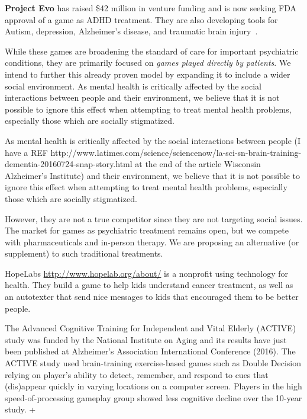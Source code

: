 \textbf{Project Evo} has raised \$42 million in venture funding and is now seeking FDA approval of a game as ADHD treatment. They are also developing tools for Autism, depression, Alzheimer’s disease, and traumatic brain injury~\cite{akili}.

While these games are broadening the standard of care for important psychiatric conditions, they are primarily focused on {\it games played directly by patients}. We intend to further this already proven model by expanding it to include a wider social environment. As mental health is critically affected by the social interactions between people and their environment, we believe that it is not possible to ignore this effect when attempting to treat mental health problems, especially those which are socially stigmatized.

As mental health is critically affected by the social interactions between people (I have a REF http://www.latimes.com/science/sciencenow/la-sci-sn-brain-training-dementia-20160724-snap-story.html at the end of the article Wisconsin Alzheimer’s Institute) and their environment, we believe that it is not possible to ignore this effect when attempting to treat mental health problems, especially those which are socially stigmatized.

However, they are not a true competitor since they are not targeting social issues. The market for games as psychiatric treatment remains open, but we compete with pharmaceuticals and in-person therapy. We are proposing an alternative (or supplement) to such traditional treatments.

HopeLabs \url{http://www.hopelab.org/about/} is a nonprofit using technology for health. They build a game to help kids understand cancer treatment, as well as an autotexter that send nice messages to kids that encouraged them to be better people.

The Advanced Cognitive Training for Independent and Vital Elderly (ACTIVE) study was funded by the National Institute on Aging and its results have just been published at Alzheimer's Association International Conference (2016). The ACTIVE study used brain-training exercise-based games such as Double Decision relying on player’s ability to detect, remember, and respond to cues that (dis)appear quickly in varying locations on a computer screen. Players in the high speed-of-processing gameplay group showed less cognitive decline over the 10-year study. +